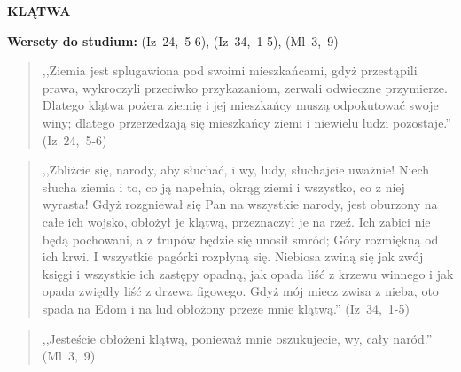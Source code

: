 \documentclass[10pt,a4paper,oneside]{article}
\begin{document}
\centerline{\textbf{\MakeUppercase{Klątwa}}}
\begin{center}
\textbf{Wersety do studium:} \mbox{(Iz 24, 5-6)}, \mbox{(Iz 34, 1-5)}, \mbox{(Ml 3, 9)}
\end{center}
\begin{quote}
,,Ziemia jest splugawiona pod swoimi mieszkańcami, gdyż przestąpili prawa, wykroczyli przeciwko przykazaniom, zerwali odwieczne przymierze. Dlatego klątwa pożera ziemię i jej mieszkańcy muszą odpokutować swoje winy; dlatego przerzedzają się mieszkańcy ziemi i niewielu ludzi pozostaje.'' \mbox{(Iz 24, 5-6)}
\end{quote}
\begin{quote}
,,Zbliżcie się, narody, aby słuchać, i wy, ludy, słuchajcie uważnie! Niech słucha ziemia i to, co ją napełnia, okrąg ziemi i wszystko, co z niej wyrasta! Gdyż rozgniewał się Pan na wszystkie narody, jest oburzony na całe ich wojsko, obłożył je klątwą, przeznaczył je na rzeź. Ich zabici nie będą pochowani, a z trupów będzie się unosił smród; Góry rozmiękną od ich krwi. I wszystkie pagórki rozpłyną się. Niebiosa zwiną się jak zwój księgi i wszystkie ich zastępy opadną, jak opada liść z krzewu winnego i jak opada zwiędły liść z drzewa figowego. Gdyż mój miecz zwisa z nieba, oto spada na Edom i na lud obłożony przeze mnie klątwą.'' \mbox{(Iz 34, 1-5)}
\end{quote}
\begin{quote}
,,Jesteście obłożeni klątwą, ponieważ mnie oszukujecie, wy, cały naród.'' \mbox{(Ml 3, 9)}
\end{quote}
\end{document}
